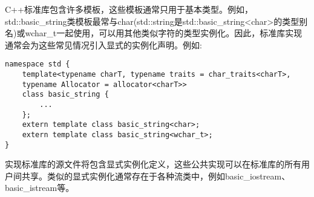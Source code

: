 C++标准库包含许多模板，这些模板通常只用于基本类型。例如，std::basic\_string类模板最常与char(std::string是std::basic\_string<char>的类型别名)或wchar\_t一起使用，可以用其他类似字符的类型实例化。因此，标准库实现通常会为这些常见情况引入显式的实例化声明。例如:

\begin{lstlisting}[style=styleCXX]
namespace std {
	template<typename charT, typename traits = char_traits<charT>,
	typename Allocator = allocator<charT>>
	class basic_string {
		...
	};
	extern template class basic_string<char>;
	extern template class basic_string<wchar_t>;
}
\end{lstlisting}

实现标准库的源文件将包含显式实例化定义，这些公共实现可以在标准库的所有用户间共享。类似的显式实例化通常存在于各种流类中，例如basic\_iostream、basic\_istream等。